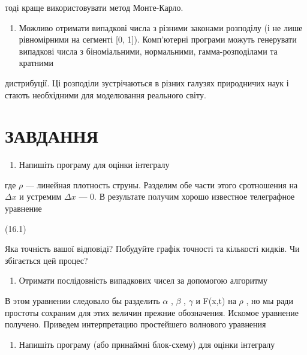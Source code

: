 \documentclass[
  ukrainian,
]{article}
\providecommand{\tightlist}{%
  \setlength{\itemsep}{0pt}\setlength{\parskip}{0pt}}
\begin{document}
тоді краще використовувати метод Монте-Карло.

\begin{enumerate}
\def\labelenumi{\arabic{enumi}.}
\setcounter{enumi}{2}
\tightlist
\item
  Можливо отримати випадкові числа з різними законами розподілу (і не
  лише рівномірними на сегменті {[}0, 1{]}). Комп'ютерні програми можуть
  генерувати випадкові числа з біноміальними, нормальними,
  гамма-розподілами та кратними
\end{enumerate}

дистрибуції. Ці розподіли зустрічаються в різних галузях природничих
наук і стають необхідними для моделювання реального світу.

\section{ЗАВДАННЯ}\label{ux437ux430ux432ux434ux430ux43dux43dux44f-9}

\begin{enumerate}
\def\labelenumi{\arabic{enumi}.}
\tightlist
\item
  Напишіть програму для оцінки інтегралу
\end{enumerate}

где \(\rho\) --- линейная плотность струны. Разделим обе части этого
сротношения на \(\Delta x\) и устремим \(\Delta x\) --- 0. В результате
получим хорошо известное телеграфное уравнение

(16.1)

Яка точність вашої відповіді? Побудуйте графік точності та кількості
кидків. Чи збігається цей процес?

\begin{enumerate}
\def\labelenumi{\arabic{enumi}.}
\setcounter{enumi}{1}
\tightlist
\item
  Отримати послідовність випадкових чисел за допомогою алгоритму
\end{enumerate}

В этом уравнении следовало бы разделить \(\alpha\) , \(\beta\) ,
\(\gamma\) и F(x,t) на \(\rho\) , но мы ради простоты сохраним для этих
величин прежние обозначения. Искомое уравнение получено. Приведем
интерпретацию простейшего волнового уравнения

\begin{enumerate}
\def\labelenumi{\arabic{enumi}.}
\setcounter{enumi}{2}
\tightlist
\item
  Напишіть програму (або принаймні блок-схему) для оцінки інтегралу
\end{enumerate}
\end{document}
